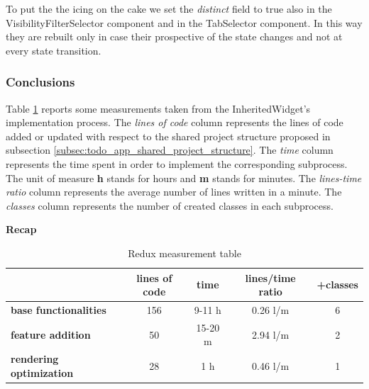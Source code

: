 To put the  the icing on the cake we set the \textit{distinct} field to true also in the VisibilityFilterSelector component and in the TabSelector component. In this way they are rebuilt only in case their prospective of the state changes and not at every state transition.

\subsubsection{Conclusions} 
\label{subpar:render_optimizations_redux}
Table \ref{table:recap_redux} reports some measurements taken from the InheritedWidget's implementation process. The \textit{lines of code} column represents the lines of code added or updated with respect to the shared project structure proposed in subsection \ref{subsec:todo_app_shared_project_structure}. The \textit{time }column represents the time spent in order to implement the corresponding subprocess. The unit of measure \textbf{h} stands for hours and \textbf{m} stands for minutes. The \textit{lines-time ratio} column represents the average number of lines written in a minute. The \textit{classes} column represents the number of created classes in each subprocess.
\begin{table}[H]
    \caption*{\textbf{Recap}}
    \centering 
    
    \begin{tabular}{| l | c | c | c | c |}
    \hline
    \rowcolor{bluepoli!40} %
    \hline
     & \textbf{lines of code} & \textbf{time} & \textbf{lines/time ratio} & +\textbf{classes} \T\B \\
    \hline
    \textbf{base functionalities} & 156 & 9-11 h & 0.26 l/m & 6 \T\B \\ 
    \textbf{feature addition} & 50 & 15-20 m & 2.94 l/m & 2 \T\B\\ 
    \textbf{rendering optimization} & 28 & 1 h & 0.46 l/m & 1
    \T\B\\
    \hline
    \end{tabular}
    \\[10pt]
    \caption{Redux measurement table}
    \label{table:recap_redux}
\end{table}

